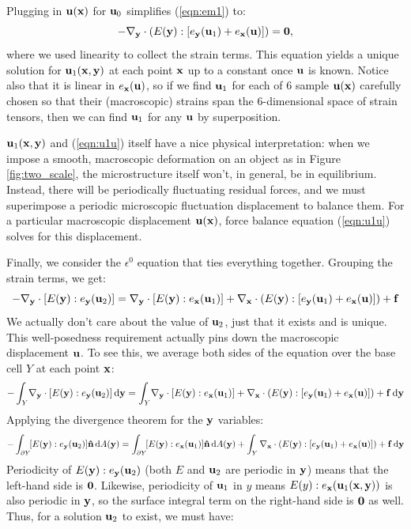 \documentclass[10pt]{article}
\providecommand{\e}{\epsilon}
\begin{document}
Plugging in ${\bf u}({\bf x})$ for ${\bf u}_0$ simplifies (\ref{eqn:em1}) to:
\begin{equation}
    \label{eqn:u1u}
    -\nabla_{\bf y} \cdot (E({\bf y}) : [e_{\bf y}({\bf u}_1) + e_{\bf x}({\bf u})]) =  {\bf 0},
\end{equation}
where we used linearity to collect the strain terms. This equation yields a
unique solution for ${\bf u}_1({\bf x}, {\bf y})$ at each point ${\bf x}$ up to
a constant once ${\bf u}$ is known. Notice also that it is linear in $e_{\bf
x}({\bf u})$, so if we find ${\bf u}_1$ for each of 6 sample ${\bf u}({\bf x})$
carefully chosen so that their (macroscopic) strains span the 6-dimensional
space of strain tensors, then we can find ${\bf u}_1$ for any ${\bf u}$ by
superposition.

${\bf u}_1({\bf x}, {\bf y})$ and (\ref{eqn:u1u}) itself have a nice physical
interpretation: when we impose a smooth, macroscopic deformation on an object
as in Figure \ref{fig:two_scale}, the microstructure itself won't, in general,
be in equilibrium. Instead, there will be periodically fluctuating residual
forces, and we must superimpose a periodic microscopic fluctuation displacement
to balance them. For a particular macroscopic displacement ${\bf u}({\bf x})$,
force balance equation (\ref{eqn:u1u}) solves for this displacement.

Finally, we consider the $\e^0$ equation that ties everything together.
Grouping the strain terms, we get:
$$
 -\nabla_{\bf y} \cdot [E({\bf y}) : e_{\bf y}({\bf u}_2)] = 
                     \nabla_{\bf y} \cdot [E({\bf y}) : e_{\bf x}({\bf u}_1)] +
                     \nabla_{\bf x} \cdot (E({\bf y}) : [e_{\bf y}({\bf u}_1) + e_{\bf x}({\bf u})]) + {\bf f}
$$
We actually don't care about the value of ${\bf u}_2$, just that it exists and
is unique. This well-posedness requirement actually pins down the macroscopic
displacement ${\bf u}$. To see this, we average both sides of the equation
over the base cell $Y$ at each point ${\bf x}$:
$$
-\int_Y \! \nabla_{\bf y} \cdot [E({\bf y}) : e_{\bf y}({\bf u}_2)] \, \mathrm{d}{\bf y} = 
         \int_Y \!   \nabla_{\bf y} \cdot [E({\bf y}) : e_{\bf x}({\bf u}_1)] +
         \nabla_{\bf x} \cdot (E({\bf y}) : [e_{\bf y}({\bf u}_1) + e_{\bf x}({\bf u})]) + {\bf f} \, \mathrm{d} {\bf y}
$$
Applying the divergence theorem for the ${\bf y}$ variables:
$$
-\int_{\partial Y} \! [E({\bf y}) : e_{\bf y}({\bf u}_2)] {\bf \hat{n}} \, \mathrm{d}A({\bf y}) =
 \int_{\partial Y} \! [E({\bf y}) : e_{\bf x}({\bf u}_1)] {\bf \hat{n}} \, \mathrm{d}A({\bf y}) +
         \int_Y \nabla_{\bf x} \cdot (E({\bf y}) : [e_{\bf y}({\bf u}_1) + e_{\bf x}({\bf u})]) + {\bf f} \, \mathrm{d} {\bf y}
$$
Periodicity of $E({\bf y}) : e_{\bf y}({\bf u}_2)$ (both $E$ and ${\bf
u}_2$ are periodic in ${\bf y}$) means that the left-hand side is ${\bf 0}$.
Likewise, periodicity of ${\bf u}_1$ in $y$ means $E(y) : e_{\bf x}({\bf
u}_1({\bf x}, {\bf y}))$ is also periodic in ${\bf y}$, so the surface integral
term on the right-hand side is ${\bf 0}$ as well. Thus, for a solution ${\bf
u}_2$ to exist, we must have:
\end{document}
